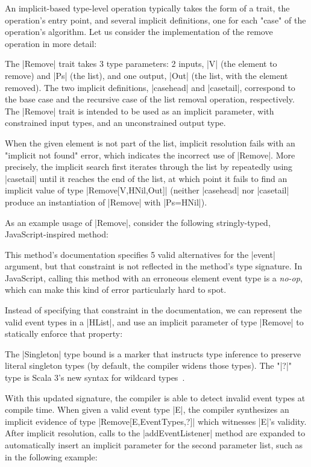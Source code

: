 An implicit-based type-level operation typically takes the form of a trait, the operation's entry point, and several implicit definitions, one for each "case" of the operation's algorithm.
Let us consider the implementation of the remove operation in more detail:

\memImplicitRemove

\noindent
The |Remove| trait takes 3 type parameters: 2 inputs, |V| (the element to remove) and |Ps| (the list), and one output, |Out| (the list, with the element removed).
The two implicit definitions, |casehead| and |casetail|, correspond to the base case and the recursive case of the list removal operation, respectively.
The |Remove| trait is intended to be used as an implicit parameter, with constrained input types, and an unconstrained output type.

When the given element is not part of the list, implicit resolution fails with an "implicit not found" error, which indicates the incorrect use of |Remove|.
More precisely, the implicit search first iterates through the list by repeatedly using |casetail| until it reaches the end of the list, at which point it fails to find an implicit value of type |Remove[V,HNil,Out]| (neither |casehead| nor |casetail| produce an instantiation of |Remove| with |Ps=HNil|).

As an example usage of |Remove|, consider the following stringly-typed, JavaScript-inspired method:

\addEventListenerJS

\noindent
This method's documentation specifies 5 valid alternatives for the |event| argument, but that constraint is not reflected in the method's type signature.
In JavaScript, calling this method with an erroneous element event type is a \emph{no-op}, which can make this kind of error particularly hard to spot.

Instead of specifying that constraint in the documentation, we can represent the valid event types in a |HList|, and use an implicit parameter of type |Remove| to statically enforce that property:

\addEventListenerImplicitDef

\noindent
The |Singleton| type bound is a marker that instructs type inference to preserve literal singleton types (by default, the compiler widens those types).
The "|?|" type is Scala 3's new syntax for wildcard types~\citep{dotty2014wildcard}.

With this updated signature, the compiler is able to detect invalid event types at compile time.
When given a valid event type |E|, the compiler synthesizes an implicit evidence of type |Remove[E,EventTypes,?]| which witnesses |E|'s validity.
After implicit resolution, calls to the |addEventListener| method are expanded to automatically insert an implicit parameter for the second parameter list, such as in the following example:

